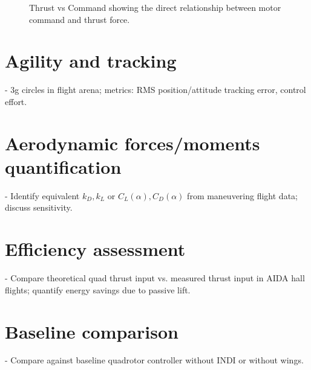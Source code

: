\begin{figure}[htbp]
  \centering
  \caption{Thrust vs Command showing the direct relationship between motor command and thrust force.}
  \label{fig:thrust_vs_cmd}
\end{figure}

\section{Agility and tracking}
- 3g circles in flight arena; metrics: RMS position/attitude tracking error, control effort.

\section{Aerodynamic forces/moments quantification}
- Identify equivalent $k_D,k_L$ or $C_L(\alpha), C_D(\alpha)$ from maneuvering flight data; discuss sensitivity.

\section{Efficiency assessment}
- Compare theoretical quad thrust input vs. measured thrust input in AIDA hall flights; quantify energy savings due to passive lift.

\section{Baseline comparison}
- Compare against baseline quadrotor controller without INDI or without wings.
